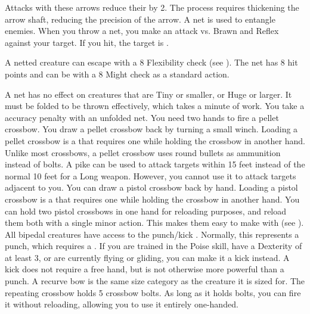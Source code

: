      Attacks with these arrows reduce their  by 2.
    The process requires thickening the arrow shaft, reducing the precision of the arrow.
     A net is used to entangle enemies. When you throw a net, you make an attack vs. Brawn and Reflex against your target. If you hit, the target is \slowed.
    \par A netted creature can escape with a  8 Flexibility check (see ). The net has 8 hit points and can be  with a  8 Might check as a standard action.
    \par A net has no effect on creatures that are Tiny or smaller, or Huge or larger. It must be folded to be thrown effectively, which takes a minute of work. You take a  accuracy penalty with an unfolded net.
     You need two hands to fire a pellet crossbow.
    You draw a pellet crossbow back by turning a small winch.
    Loading a pellet crossbow is a  that requires one  while holding the crossbow in another hand.
    Unlike most crossbows, a pellet crossbow uses round bullets as ammunition instead of bolts.
     A pike can be used to attack targets within 15 feet instead of the normal 10 feet for a Long weapon.
    However, you cannot use it to attack targets adjacent to you.
     You can draw a pistol crossbow back by hand.
    Loading a pistol crossbow is a  that requires one  while holding the crossbow in another hand.
    You can hold two pistol crossbows in one hand for reloading purposes, and reload them both with a single minor action.
    This makes them easy to make  with (see ).
     All bipedal creatures have access to the punch/kick .
    Normally, this represents a punch, which requires a .
    If you are trained in the Poise skill, have a Dexterity of at least 3, or are currently flying or gliding, you can make it a kick instead.
    A kick does not require a free hand, but is not otherwise more powerful than a punch.
     A recurve bow is the same size category as the creature it is sized for.
     The repeating crossbow holds 5 crossbow bolts.
    As long as it holds bolts, you can fire it without reloading, allowing you to use it entirely one-handed.
